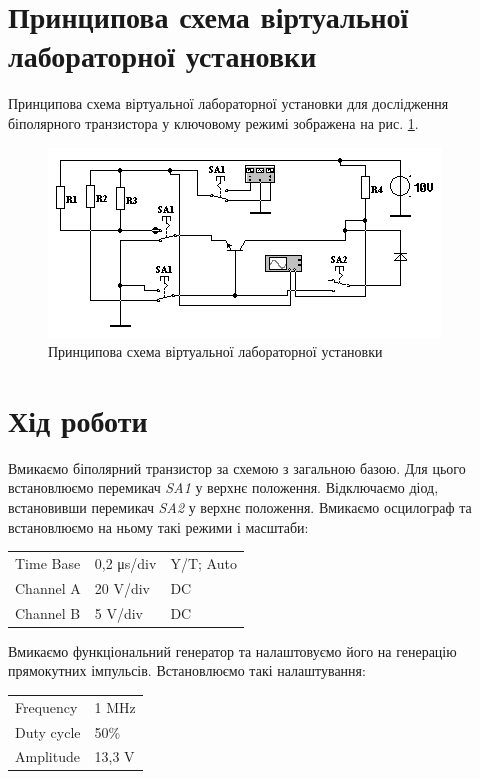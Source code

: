 \documentclass[a4paper,oneside,DIV=10,12pt]{scrartcl}
\newcommand\schel[1]{\textit{#1}}
\begin{document}
	\section{Принципова схема віртуальної лабораторної установки}
		Принципова схема віртуальної лабораторної установки для дослідження біполярного транзистора у ключовому режимі зображена на рис. \ref{fig:schematic}.
		\begin{figure}[H]
			\centering
			\includegraphics[width=\textwidth]{lab-03-01-schematic.png}
			\caption{Принципова схема віртуальної лабораторної установки}
			\label{fig:schematic}
		\end{figure}
		
	\section{Хід роботи}
		Вмикаємо біполярний транзистор за схемою з загальною базою. Для цього встановлюємо перемикач \schel{SA1} у верхнє положення. Відключаємо діод, встановивши перемикач \schel{SA2} у верхнє положення. Вмикаємо осцилограф та встановлюємо на ньому такі режими і масштаби:
		\begin{table}[H]
		\centering
			\begin{tabular}{lll}
			Time Base & 0,2 μs/div & Y/T; Auto\\
			Channel A & 20 V/div & DC \\
			Channel B & 5 V/div & DC
			\end{tabular}
		\end{table}
		
		Вмикаємо функціональний генератор та налаштовуємо його на генерацію прямокутних імпульсів. Встановлюємо такі налаштування:
		\begin{table}[H]
		\centering
			\begin{tabular}{ll}
			Frequency & 1 MHz\\
			Duty cycle & 50\%\\
			Amplitude & 13,3 V
			\end{tabular}
		\end{table}
		
\end{document}

